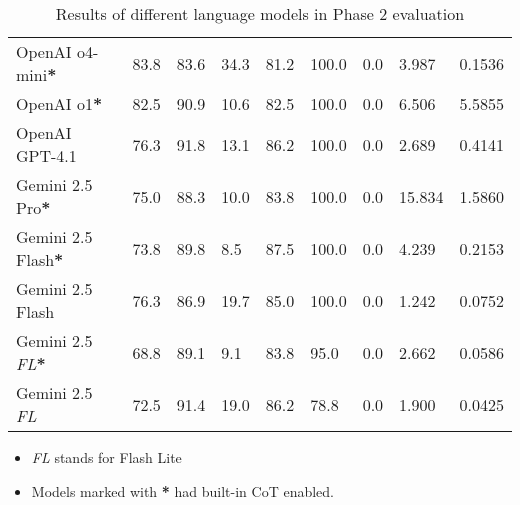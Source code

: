 \begin{table}[h]
\begin{tabularx}{\textwidth}{Xp{1.1cm}p{1.25cm}p{1.6cm}p{1.3cm}p{1.3cm}p{1.3cm}p{1.3cm}p{1.3cm}}
        \rowcolor[gray]{0.9}
        OpenAI o4-mini\textbf{*}         & 83.8                        & 83.6                            & 34.3                   & 81.2                   & 100.0                    & 0.0               & 3.987                         & 0.1536                           \\
        OpenAI o1\textbf{*}              & 82.5                        & 90.9                            & 10.6                   & 82.5                   & 100.0                    & 0.0               & 6.506                         & 5.5855                           \\
        \rowcolor[gray]{0.9}
        OpenAI GPT-4.1                   & 76.3                        & 91.8                            & 13.1                   & 86.2                   & 100.0                    & 0.0               & 2.689                         & 0.4141                           \\
        Gemini 2.5 Pro\textbf{*}         & 75.0                        & 88.3                            & 10.0                   & 83.8                   & 100.0                    & 0.0               & 15.834                        & 1.5860                           \\
        \rowcolor[gray]{0.9}
        Gemini 2.5 Flash\textbf{*}       & 73.8                        & 89.8                            & 8.5                    & 87.5                   & 100.0                    & 0.0               & 4.239                         & 0.2153                           \\
        Gemini 2.5 Flash                 & 76.3                        & 86.9                            & 19.7                   & 85.0                   & 100.0                    & 0.0               & 1.242                         & 0.0752                           \\
        \rowcolor[gray]{0.9}
        Gemini 2.5 \textit{FL}\textbf{*} & 68.8                        & 89.1                            & 9.1                    & 83.8                   & 95.0                     & 0.0               & 2.662                         & 0.0586                           \\
        Gemini 2.5 \textit{FL}           & 72.5                        & 91.4                            & 19.0                   & 86.2                   & 78.8                     & 0.0               & 1.900                         & 0.0425                           \\
        \bottomrule
    \end{tabularx}

    \begin{itemize}
        \footnotesize
        \item \textit{FL} stands for Flash Lite
        \item Models marked with \textbf{*} had built-in CoT enabled.
    \end{itemize}
    \caption{Results of different language models in Phase 2 evaluation}
    \label{tab:phase2_results}
\end{table}
